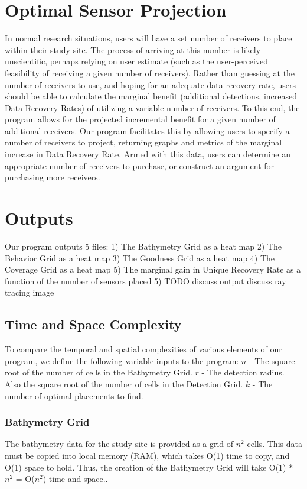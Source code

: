 \section{Optimal Sensor Projection}
In normal research situations, users will have a set number of receivers to place within their study site.  The process of arriving at this number is likely unscientific, perhaps relying on user estimate (such as the user-perceived feasibility of receiving a given number of receivers).  Rather than guessing at the number of receivers to use, and hoping for an adequate data recovery rate, users should be able to calculate the marginal benefit (additional detections, increased Data Recovery Rates) of utilizing a variable number of receivers.   To this end, the program allows for the projected incremental benefit for a given number of additional receivers.  Our program facilitates this by allowing users to specify a number of receivers to project, returning graphs and metrics of the marginal increase in Data Recovery Rate.  Armed with this data, users can determine an appropriate number of receivers to purchase, or construct an argument for purchasing more receivers.

\section{Outputs}
Our program outputs 5 files:
1) The Bathymetry Grid as a heat map
2) The Behavior Grid as a heat map
3) The Goodness Grid as a heat map
4) The Coverage Grid as a heat map
5) The marginal gain in Unique Recovery Rate as a function of the number of sensors placed
5) 
TODO
discuss output
discuss ray tracing image


\subsection{Time and Space Complexity}
\label{computationalComplexity}
To compare the temporal and spatial complexities of various elements of our program, we define the following variable inputs to the program:\newline
$n$ - The square root of the number of cells in the Bathymetry Grid.\newline
$r$ - The detection radius.  Also the square root of the number of cells in the Detection Grid.\newline
$k$ - The number of optimal placements to find.\newline

\subsubsection{Bathymetry Grid}
The bathymetry data for the study site is provided as a grid of $n^2$ cells.  This data must be copied into local memory (RAM), which takes O(1) time to copy, and O(1) space to hold.  Thus, the creation of the Bathymetry Grid will take O(1) * $n^2$ = O($n^2$) time and space..

